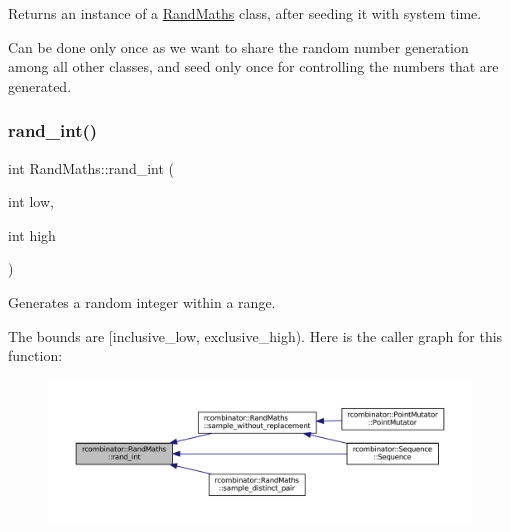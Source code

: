 Returns an instance of a \mbox{\hyperlink{classrcombinator_1_1RandMaths}{Rand\+Maths}} class, after seeding it with system time. 

Can be done only once as we want to share the random number generation among all other classes, and seed only once for controlling the numbers that are generated. \mbox{\label{classrcombinator_1_1RandMaths_ae417da209eb8a9d1b2217e7a5397926c}} 
\subsubsection{\texorpdfstring{rand\+\_\+int()}{rand\_int()}}
{\footnotesize\ttfamily int Rand\+Maths\+::rand\+\_\+int (\begin{DoxyParamCaption}\item[{int}]{low,  }\item[{int}]{high }\end{DoxyParamCaption})}



Generates a random integer within a range. 

The bounds are \mbox{[}inclusive\+\_\+low, exclusive\+\_\+high). Here is the caller graph for this function\+:
\nopagebreak
\begin{figure}[H]
\begin{center}
\leavevmode
\includegraphics[width=350pt]{classrcombinator_1_1RandMaths_ae417da209eb8a9d1b2217e7a5397926c_icgraph}
\end{center}
\end{figure}
\mbox{\label{classrcombinator_1_1RandMaths_a1fec117f0ebd5a7834fdcf649a23edd7}} 

